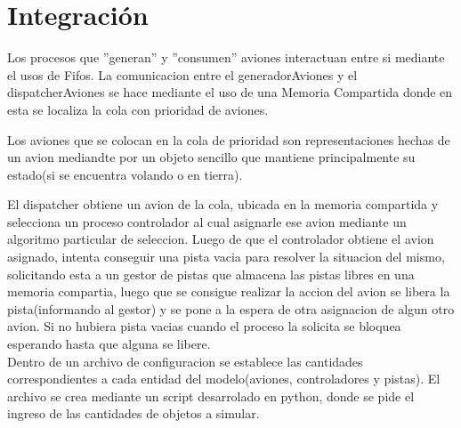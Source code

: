 \documentclass[a4paper,12pt,titlepage]{article}
\begin{document}
\newpage
\section{Integración}


Los procesos que ''generan'' y ''consumen'' aviones interactuan entre si mediante el usos de Fifos. La comunicacion entre el generadorAviones y el dispatcherAviones se hace mediante el uso de una Memoria Compartida donde en esta se localiza la cola con prioridad de aviones. 

Los aviones que se colocan en la cola de prioridad son representaciones hechas de un avion mediandte por un objeto sencillo que mantiene principalmente su estado(si se encuentra volando o en tierra).

El dispatcher obtiene un avion de la cola, ubicada en la memoria compartida y selecciona un proceso controlador al cual asignarle ese avion mediante un algoritmo particular de seleccion.
Luego de que el controlador obtiene el avion asignado, intenta conseguir una pista vacia para resolver la situacion del mismo, solicitando esta a un gestor de pistas que almacena las pistas libres en una memoria compartia, luego que se consigue realizar la accion del avion se libera la pista(informando al gestor) y se pone a la espera de otra asignacion de algun otro avion. Si no hubiera pista vacias cuando el proceso la solicita se bloquea esperando hasta que alguna se libere.\\


Dentro de un archivo de configuracion se establece las cantidades correspondientes a cada entidad del modelo(aviones, controladores y pistas). El archivo se crea mediante un script desarrolado en python, donde se pide el ingreso de las cantidades de objetos a simular.
\end{document}
